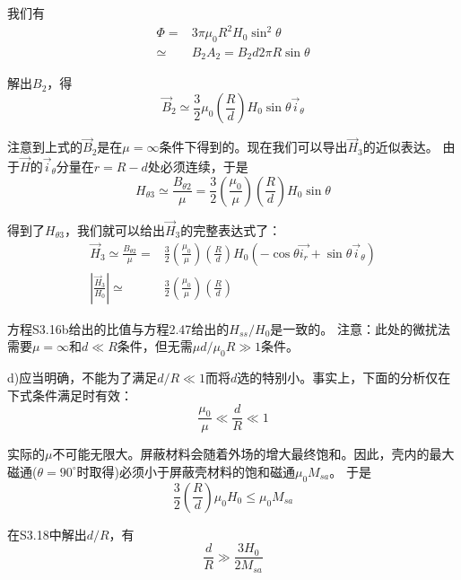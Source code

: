 我们有
\begin{align}
\Phi=&3\pi\mu_0 R^2 H_0 \sin^2 \theta\nonumber\\
\simeq& B_2 A_2=B_2 d 2 \pi R \sin\theta \tag{S3.13}
\end{align}

解出$B_2$，得
\begin{equation*}
\vec{B}_2\simeq \frac{3}{2}\mu_0 \left(\frac{R}{d}\right) H_0\sin\theta\vec{i}_\theta \tag{S3.14}
\end{equation*}

注意到上式的$\vec{B}_2$是在$\mu=\infty$条件下得到的。现在我们可以导出$\vec{H}_3$的近似表达。
由于$\vec{H}$的$\vec{i}_\theta$分量在$r=R-d$处必须连续，于是
\begin{equation*}
H_{\theta 3}\simeq \frac{B_{\theta 2}}{\mu}=\frac{3}{2}\left(\frac{\mu_0}{\mu}\right)\left(\frac{R}{d}\right)H_0\sin\theta \tag{S3.15}
\end{equation*}

得到了$H_{\theta 3}$，我们就可以给出$\vec{H}_3$的完整表达式了：
\begin{align}
\vec{H}_3\simeq \frac{B_{\theta 2}}{\mu}=&\frac{3}{2}\left(\frac{\mu_0}{\mu}\right)\left(\frac{R}{d}\right)H_0(-\cos\theta\vec{i_r}+\sin\theta\vec{i}_\theta) \nonumber\tag{S3.16a}\\
\left|\frac{\vec{H}_3}{H_0}\right|\simeq& \frac{3}{2}\left(\frac{\mu_0}{\mu}\right)\left(\frac{R}{d}\right) \nonumber\tag{S3.16b}
\end{align}

方程S3.16b给出的比值与方程2.47给出的$H_{ss}/H_0$是一致的。
注意：此处的微扰法需要$\mu=\infty$和$d\ll R$条件，但无需$\mu d/\mu_0 R \gg 1$条件。

d)应当明确，不能为了满足$d/R \ll 1$而将$d$选的特别小。事实上，下面的分析仅在下式条件满足时有效：
\begin{equation*}
\frac{\mu_0}{\mu} \ll \frac{d}{R} \ll 1 \tag{S3.17}
\end{equation*}

实际的$\mu$不可能无限大。屏蔽材料会随着外场的增大最终饱和。因此，壳内的最大磁通($\theta=90^\circ$时取得)必须小于屏蔽壳材料的饱和磁通$\mu_0 M_{sa}$。
于是
\begin{equation*}
\frac{3}{2}\left(\frac{R}{d}\right)\mu_0 H_0 \le \mu_0 M_{sa}  \tag{S3.18}
\end{equation*}

在S3.18中解出$d/R$，有
\begin{equation*}
\frac{d}{R}\gg \frac{3H_0}{2M_{sa}}  \tag{2.48}
\end{equation*}

